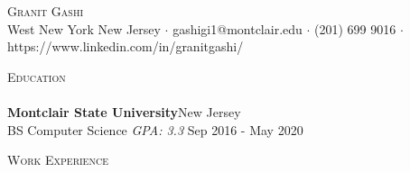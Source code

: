 \documentclass[a4paper]{article}
\newcommand{\lineunder} {
    \vspace*{-8pt} \\
    \hspace*{-18pt} \hrulefill \\
}
\newcommand{\header} [1] {
    {\hspace*{-18pt}\vspace*{6pt} \textsc{#1}}
    \vspace*{-6pt} \lineunder
}
\begin{document}
\vspace*{-40pt}

    

\vspace*{-10pt}
\begin{center}
	{\Huge \scshape {Granit Gashi}}\\
	West New York New Jersey $\cdot$ gashigi1@montclair.edu $\cdot$ (201) 699 9016 $\cdot$ https://www.linkedin.com/in/granitgashi/\\
\end{center}

\header{Education}
\textbf{Montclair State University}\hfill New Jersey\\
BS Computer Science \textit{GPA: 3.3} \hfill Sep 2016 - May 2020\\
\vspace{2mm}

\header{Work Experience}
\vspace{1mm}
\end{document}
